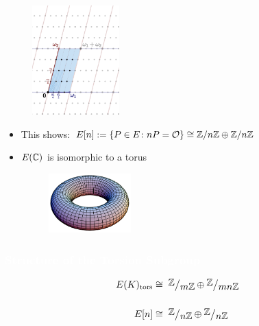 \begin{frame}[plain]
	\begin{figure}[!ht]
	\centering
	\includegraphics[width=0.3\textwidth]{images/lattice.png}
	\end{figure}

\begin{itemize}
\item This shows: $E[n]:= \{ P \in E \colon nP= \mathcal{O} \} \cong \mathbb{Z}/n\mathbb{Z} \oplus \mathbb{Z}/n\mathbb{Z}$
\item $E(\mathbb{C})$ is isomorphic to a torus
	\begin{figure}[!ht]
	\centering
	\includegraphics[width=0.3\textwidth]{images/torus.png}
	\end{figure}
\end{itemize}
\end{frame}




\begin{frame}[plain]
\frametitle{\textcolor{white}{Structure of the Torsion Subgroup}}
	\[
	\begin{split}
	E(K)_{\text{tors}} &\cong\; \qfrac{\Z}{m\Z} \oplus \qfrac{\Z}{mn\Z} \\[0.5cm]
	E[n] &\cong\; \qfrac{\Z}{n\Z} \oplus \qfrac{\Z}{n\Z}
	\end{split}
	\]
\end{frame}



